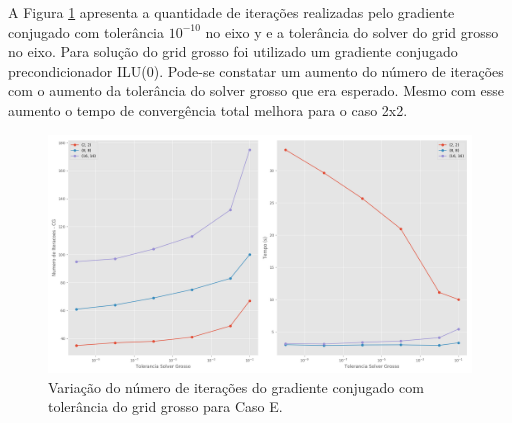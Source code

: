 A Figura \ref{fig:toleranciaGrossa} apresenta a quantidade de iterações realizadas pelo gradiente conjugado com tolerância $10^{-10}$ no eixo y e a tolerância do solver do grid grosso no eixo. Para solução do grid grosso foi utilizado um gradiente conjugado precondicionador ILU(0). Pode-se constatar um aumento do número de iterações com o aumento da tolerância do solver grosso que era esperado. Mesmo com esse aumento o tempo de convergência total melhora para o caso 2x2.



\begin{figure}[!htbp]
\centering
\includegraphics[width=\textwidth]{chap08/figs/Acuracia93MM.png}
\caption{ Variação do número de iterações do gradiente conjugado com tolerância do grid grosso para Caso E.}
\label{fig:toleranciaGrossa}
\end{figure}


